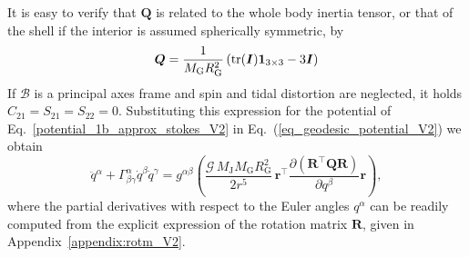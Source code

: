 \documentclass[lineno, pdflatex,sn-mathphys-ay]{sn-jnl}
\theoremstyle{thmstyleone}%
\theoremstyle{thmstyletwo}%
\theoremstyle{thmstylethree}%
\renewcommand{\vec}[1]{\boldsymbol{#1}}
\begin{document}
%
It is easy to verify that $\vec{Q}$ is related to the whole body inertia tensor, or that of the shell if the interior is assumed spherically symmetric, by
\begin{equation}\label{eq:Q2I_V2}
	\vec{Q} =
	 \frac{1}{{M}_{\mathrm{G}}R_\mathrm{G}^2}\left( \tr(\vec{I})\vec{1}_{3\times 3} - 3 \vec{I} \right)
\end{equation} 
%
If $\mathcal{B}$ is a principal axes frame and spin and tidal distortion are neglected, it holds ${C_{21} = S_{21} = S_{22} = 0}$.
%
Substituting this expression for the potential of Eq.~\eqref{potential_1b_approx_stokes_V2} in Eq.~(\ref{eq_geodesic_potential_V2}) we obtain 
%
\begin{equation}\label{eq:geodesic_explicit_V2}
	\ddot{q}^\alpha + 
	\Gamma^{\alpha}_{\beta\gamma} \dot{q}^\beta \dot{q}^\gamma =
	g^{\alpha\beta}
	\left(  
	\frac{\mathcal{G} \, M_{\mathrm{J}} {M}_{\mathrm{G}}R_\mathrm{G}^2 }{2 r^5}  \,
	\vec{r}^\top  \frac{\partial (\vec{R}^\top \vec{Q} \vec{R})}{\partial q^\beta} 
	{\vec{r}} 
	\right), %
\end{equation}
%
where the partial derivatives with respect to the Euler angles $q^\alpha$ can be readily computed from the explicit expression of the rotation matrix $\vec{R}$, given in Appendix~\ref{appendix:rotm_V2}.
%
\end{document}
